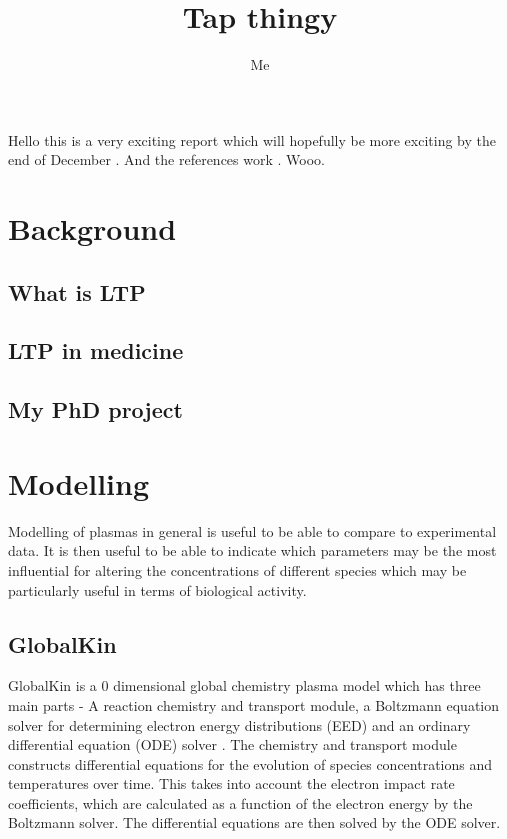 \documentclass[11pt, oneside]{article}   	%
\title{Tap thingy}
\author{Me}
\begin{document}
\maketitle

Hello this is a very exciting report which will hopefully be more exciting by the end of December \cite{Weltmann2009}. And the references work \cite{Schroter2015atomic}. Wooo.

\section{Background}
\subsection{What is LTP}
\subsection{LTP in medicine}
\subsection{My PhD project}

\section{Modelling}
Modelling of plasmas in general is useful to be able to compare to experimental data. 
It is then useful to be able to indicate which parameters may be the most influential for altering the concentrations of different species which may be particularly useful in terms of biological activity.

\subsection{GlobalKin}
GlobalKin is a 0 dimensional global chemistry plasma model which has three main parts - A reaction chemistry and transport module, a Boltzmann equation solver for determining electron energy distributions (EED) and an ordinary differential equation (ODE) solver \cite{Stafford2004O2}.
The chemistry and transport module constructs differential equations for the evolution of species concentrations and temperatures over time. 
This takes into account the electron impact rate coefficients, which are calculated as a function of the electron energy by the Boltzmann solver.
The differential equations are then solved by the ODE solver.
\end{document}

